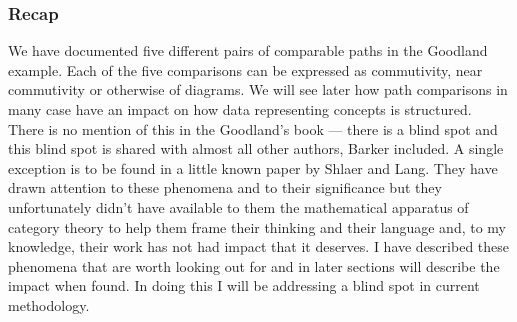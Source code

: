 \subsubsection{Recap}
We have documented five different pairs of comparable paths in the Goodland example. 
Each of the five comparisons can be expressed as commutivity, near commutivity or otherwise of diagrams. 
We will see later how path comparisons in many case have an impact on how data representing concepts is structured. There is no mention of this in the Goodland's book --- there is a blind spot and this
blind spot is shared with almost all other authors, Barker included. 
A single exception is to be found  in a little known paper by Shlaer and Lang. 
They have drawn attention to these phenomena  and to their significance but they unfortunately didn't have 
 available to them the mathematical apparatus of category theory to help them frame their thinking and their language and, to my knowledge, their work has not had impact that it deserves. 
I have described these phenomena that are worth looking out for 
and in later sections will describe the impact  when found. 
In doing this I will be addressing a blind spot in current methodology.